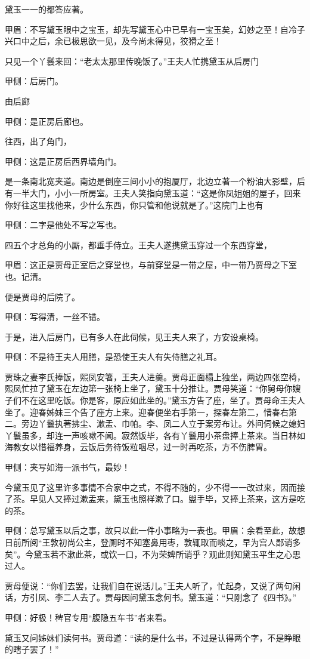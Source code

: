 \begin{parag}
    黛玉一一的都答应著。\begin{note}甲眉：不写黛玉眼中之宝玉，却先写黛玉心中已早有一宝玉矣，幻妙之至！自冷子兴口中之后，余已极思欲一见，及今尚未得见，狡猾之至！\end{note}只见一个丫鬟来回：“老太太那里传晚饭了。”王夫人忙携黛玉从后房门\begin{note}甲侧：后房门。\end{note}由后廊\begin{note}甲侧：是正房后廊也。\end{note}往西，出了角门，\begin{note}甲侧：这是正房后西界墙角门。\end{note}是一条南北宽夹道。南边是倒座三间小小的抱厦厅，北边立著一个粉油大影壁，后有一半大门，小小一所房室。王夫人笑指向黛玉道：“这是你凤姐姐的屋子，回来你好往这里找他来，少什么东西，你只管和他说就是了。”这院门上也有\begin{note}甲侧：二字是他处不写之写也。\end{note}四五个才总角的小厮，都垂手侍立。王夫人遂携黛玉穿过一个东西穿堂，\begin{note}甲眉：这正是贾母正室后之穿堂也，与前穿堂是一带之屋，中一带乃贾母之下室也。记清。\end{note}便是贾母的后院了。\begin{note}甲侧：写得清，一丝不错。\end{note}于是，进入后房门，已有多人在此伺候，见王夫人来了，方安设桌椅。\begin{note}甲侧：不是待王夫人用膳，是恐使王夫人有失侍膳之礼耳。\end{note}贾珠之妻李氏捧饭，熙凤安箸，王夫人进羹。贾母正面榻上独坐，两边四张空椅，熙凤忙拉了黛玉在左边第一张椅上坐了，黛玉十分推让。贾母笑道：“你舅母你嫂子们不在这里吃饭。你是客，原应如此坐的。”黛玉方告了座，坐了。贾母命王夫人坐了。迎春姊妹三个告了座方上来。迎春便坐右手第一，探春左第二，惜春右第二。旁边丫鬟执著拂尘、漱盂、巾帕。李、凤二人立于案旁布让。外间伺候之媳妇丫鬟虽多，却连一声咳嗽不闻。寂然饭毕，各有丫鬟用小茶盘捧上茶来。当日林如海教女以惜福养身，云饭后务待饭粒咽尽，过一时再吃茶，方不伤脾胃。\begin{note}甲侧：夹写如海一派书气，最妙！\end{note}今黛玉见了这里许多事情不合家中之式，不得不随的，少不得一一改过来，因而接了茶。早见人又捧过漱盂来，黛玉也照样漱了口。盥手毕，又捧上茶来，这方是吃的茶。\begin{note}甲侧：总写黛玉以后之事，故只以此一件小事略为一表也。甲眉：余看至此，故想日前所阅“王敦初尚公主，登厕时不知塞鼻用枣，敦辄取而啖之，早为宫人鄙诮多矣”。今黛玉若不漱此茶，或饮一口，不为荣婢所诮乎？观此则知黛玉平生之心思过人。\end{note}贾母便说：“你们去罢，让我们自在说话儿。”王夫人听了，忙起身，又说了两句闲话，方引凤、李二人去了。贾母因问黛玉念何书。黛玉道：“只刚念了《四书》。”\begin{note}甲侧：好极！稗官专用“腹隐五车书”者来看。\end{note}黛玉又问姊妹们读何书。贾母道：“读的是什么书，不过是认得两个字，不是睁眼的瞎子罢了！”
\end{parag}


